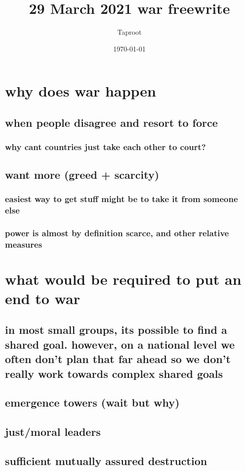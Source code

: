 \documentclass[letterpaper]{article}
\author{Taproot}
\date{\today}
\title{29 March 2021 war freewrite}
\renewcommand{\tableofcontents}{}
\begin{document}
\tableofcontents

\section{why does war happen}
\label{sec:org56221cc}
\subsection{when people disagree and resort to force}
\label{sec:org8b9f9f3}
\subsubsection{why cant countries just take each other to court?}
\label{sec:orgb66e163}
\subsection{want more (greed + scarcity)}
\label{sec:org54a6d0f}
\subsubsection{easiest way to get stuff might be to take it from someone else}
\label{sec:org874c4bc}
\subsubsection{power is almost by definition scarce, and other relative measures}
\label{sec:org36a0afa}
\section{what would be required to put an end to war}
\label{sec:orgf798d22}
\subsection{in most small groups, its possible to find a shared goal. however, on a national level we often don't plan that far ahead so we don't really work towards complex shared goals}
\label{sec:orga131c0f}
\subsection{emergence towers (wait but why)}
\label{sec:org3bae93f}
\subsection{just/moral leaders}
\label{sec:org2a78f33}
\subsection{sufficient mutually assured destruction}
\label{sec:orgfed5009}
\end{document}

